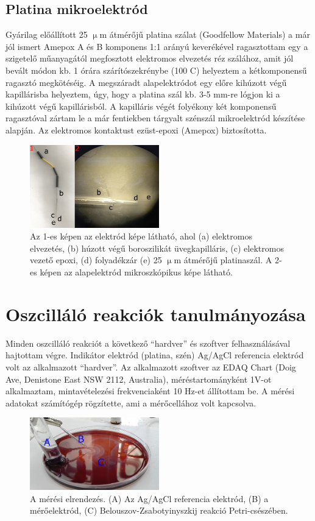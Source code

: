 \subsection{Platina mikroelektród}
Gyárilag előállított 25 $\upmu$m átmérőjű platina szálat (Goodfellow Materials) a már jól ismert Amepox A és B komponens 1:1 arányú keverékével ragasztottam egy a szigetelő műanyagától megfosztott elektromos elvezetés réz szálához, amit jól bevált módon kb. 1 órára szárítószekrénybe (100 \textdegree C) helyeztem a kétkomponensű ragasztó megkötéséig.  A megszáradt alapelektródot egy előre kihúzott végű kapillárisba helyeztem, úgy, hogy a platina szál kb. 3-5 mm-re lógjon ki a kihúzott végű kapillárisból. A kapilláris végét folyékony két komponensű ragasztóval zártam le a már fentiekben tárgyalt szénszál mikroelektród készítése alapján. Az elektromos kontaktust ezüst-epoxi (Amepox) biztosította.
\begin{figure}[h]
\centering
\includegraphics[width=0.5\textwidth]{img/platina.png}
\caption{Az 1-es képen az elektród képe látható, ahol (a) elektromos elvezetés, (b) húzott végű boroszilikát üvegkapilláris, (c) elektromos vezető epoxi, (d) folyadékzár  (e) 25 $\upmu$m átmérőjű platinaszál. A 2-es képen az alapelektród mikroszkópikus képe látható.}
\label{fig:ionophores}
\end{figure}


\section{Oszcilláló reakciók tanulmányozása} 

Minden oszcilláló reakciót a következő “hardver” és szoftver felhasználásával hajtottam végre. Indikátor elektród (platina, szén) Ag/AgCl referencia elektród volt az alkalmazott “hardver”.  Az alkalmazott szoftver az EDAQ Chart (Doig Ave, Denistone East NSW 2112, Australia),  méréstartományként 1V-ot alkalmaztam, mintavételezési frekvenciaként 10 Hz-et állítottam be. A mérési adatokat számítógép rögzítette, ami a mérőcellához volt kapcsolva.

\begin{figure}[h!]
\centering
\includegraphics[width=0.5\textwidth]{img/setup.png}
\caption{A mérési elrendezés. (A) Az Ag/AgCl referencia elektród, (B) a mérőelektród, (C) Belouszov-Zsabotyinyszkij reakció Petri-csészében.}
\label{fig:setup}
\end{figure}


